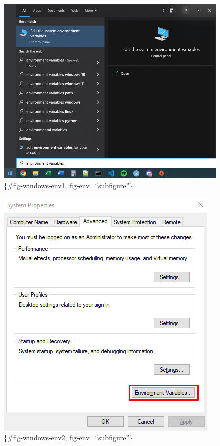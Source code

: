 \documentclass[
  11pt,
  letterpaper,
  DIV=11,
  numbers=noendperiod]{scrreprt}
\begin{document}
\begin{figure}

{\centering 

\includegraphics{Chapters/../Figures/windows-environment-variables1.png}\{\#fig-windows-env1,
fig-env=``subfigure''\}

\includegraphics{Chapters/../Figures/windows-environment-variables2.png}\{\#fig-windows-env2,
fig-env=``subfigure''\}

}
\end{figure}
\end{document}
